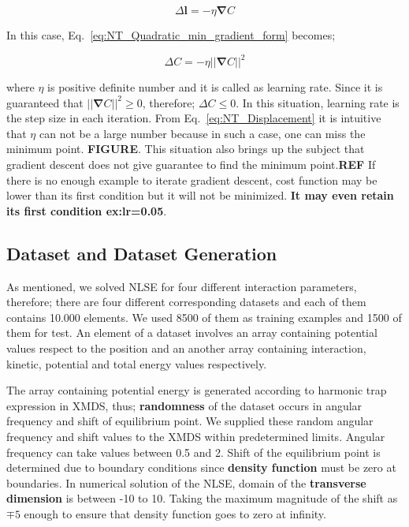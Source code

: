 \documentclass[a4paper,times,12pt]{article}
\begin{document}
\begin{equation}
\label{eq:NT_learning_rate}
\Delta{\boldsymbol{l}} = -\eta\boldsymbol{\nabla}C
\end{equation}

In this case, Eq.~\ref{eq:NT_Quadratic_min_gradient_form} becomes;

\begin{equation}
\label{eq:NT_Displacement}
\Delta{C} = -\eta ||\boldsymbol{\nabla}{C}||^2
\end{equation}

where $\eta$ is positive definite number and it is called as learning rate. Since it is guaranteed that $||\boldsymbol{\nabla}{C}||^2 \geq 0$, therefore; $\Delta{C} \leq 0$. In this situation, learning rate is the step size in each iteration. From Eq.~\ref{eq:NT_Displacement} it is intuitive that $\eta$ can not be a large number because in such a case, one can miss the minimum point. \textbf{FIGURE}. This situation also brings up the subject that gradient descent does not give guarantee to find the minimum point.{\textbf{REF}} If there is no enough example to iterate gradient descent, cost function may be lower than its first condition but it will not be minimized. \textbf{It may even retain its first condition ex:lr=0.05}. 

\subsection{Dataset and Dataset Generation}

As mentioned, we solved NLSE for four different interaction parameters, therefore; there are four different corresponding datasets and each of them contains 10.000 elements. We used 8500 of them as training examples and 1500 of them for test. An element of a dataset involves an array containing potential values respect to the position and an another array containing interaction, kinetic, potential and total energy values respectively. 

The array containing potential energy is generated according to harmonic trap expression in XMDS, thus; \textbf{randomness} of the dataset occurs in angular frequency and shift of equilibrium point. We supplied these random angular frequency and shift values to the XMDS within predetermined limits. Angular frequency can take values between 0.5 and 2. Shift of the equilibrium point is determined due to boundary conditions since \textbf{density function} must be zero at boundaries. In numerical solution of the NLSE, domain of the \textbf{transverse dimension} is between -10 to 10. Taking the maximum magnitude of the shift as $\mp 5$ enough to ensure that density function goes to zero at infinity.
\end{document}
